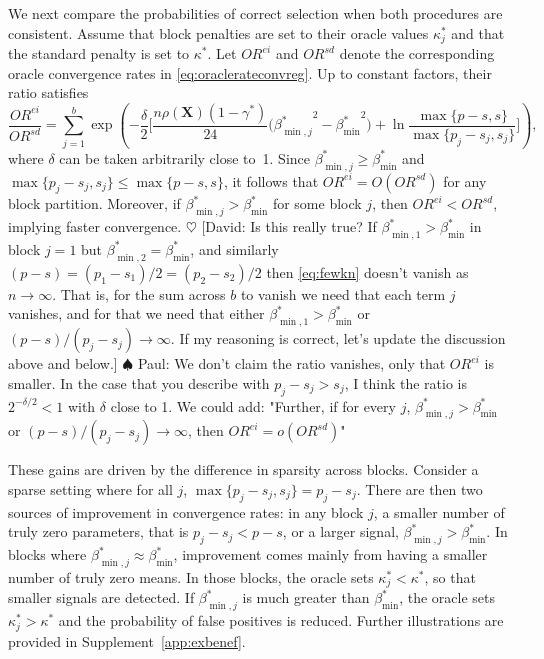 \documentclass[
  12pt]{article}
\newcommand{\david}[1]{{\small{\color{blue} \sf $\heartsuit$ [David: #1]}}}
\newcommand{\paul}[1]{{\small{\color{green} \sf $\spadesuit$ Paul: #1}}}
\newcommand{\bX}{\mathbf{X}}
\begin{document}
We next compare the probabilities of correct selection when both procedures are consistent. Assume that block penalties are set to their oracle values $\kappa_j^*$ and that the standard penalty is set to $\kappa^*$. Let $OR^{ei}$ and $OR^{sd}$ denote the corresponding oracle convergence rates in \eqref{eq:oraclerateconvreg}. Up to constant factors, their ratio satisfies
\begin{equation}\label{eq:fewkn}
\frac{OR^{ei}}{OR^{sd}}
=
\sum_{j=1}^b
\exp\!\left(
-\frac{\delta}{2}
\Big[
\frac{n\rho(\bX)(1-\gamma^*)}{24}
\big({\beta^*_{\min,j}}^2-{\beta_{\min}^*}^2\big)
+
\ln\!\frac{\max\{p-s,s\}}{\max\{p_j-s_j,s_j\}}
\Big]
\right),
\end{equation}
where $\delta$ can be taken arbitrarily close to~1.  Since $\beta^*_{\min,j}\ge\beta^*_{\min}$ and $\max\{p_j-s_j,s_j\}\le\max\{p-s,s\}$, it follows that $OR^{ei}=O(OR^{sd})$ for any block partition.
Moreover, if $\beta^*_{\min,j}>\beta^*_{\min}$ for some block $j$, then $OR^{ei}<OR^{sd}$, implying faster convergence. \david{Is this really true? If $\beta^*_{\min,1}>\beta^*_{\min}$ in block $j=1$ but $\beta^*_{\min,2}=\beta^*_{\min}$, and similarly $(p-s) = (p_1-s_1)/2= (p_2-s_2)/2$ then \eqref{eq:fewkn} doesn't vanish as $n \to \infty$. That is, for the sum across $b$ to vanish we need that each term $j$ vanishes, and for that we need that either $\beta^*_{\min,1}>\beta^*_{\min}$ or $(p-s) / (p_j - s_j) \to \infty$. If my reasoning is correct, let's update the discussion above and below.}\paul{We don't claim the ratio vanishes, only that $OR^{ei}$ is smaller. In the case that you describe with $p_j-s_j>s_j$, I think the ratio is $2^{-\delta/2}<1$ with $\delta$ close to 1. We could add: "Further, if for every $j$, $\beta^*_{\min,j}>\beta^*_{\min}$ or $(p-s) / (p_j - s_j) \to \infty$, then $OR^{ei}=o(OR^{sd})$"}

These gains are driven by the difference in sparsity across blocks. Consider a sparse setting where for all $j$, $\max\{p_j-s_j,s_j\}=p_j-s_j$. There are then two sources of improvement in convergence rates: in any block $j$, a smaller number of truly zero parameters, that is $p_j-s_j< p-s$, or a larger signal, $\beta^*_{\min,j} > \beta_{\min}^*$. In blocks where $\beta^*_{\min,j} \approx \beta_{\min}^*$, improvement comes mainly from having a smaller number of truly zero means. In those blocks,
the oracle sets $\kappa^*_j < \kappa^*$, so that smaller signals are detected. If $\beta^*_{\min,j}$ is much greater than $\beta_{\min}^*$, the oracle sets $\kappa^*_j > \kappa^*$ and the probability of false positives is reduced. Further illustrations are provided in Supplement~\ref{app:exbenef}.
\end{document}
